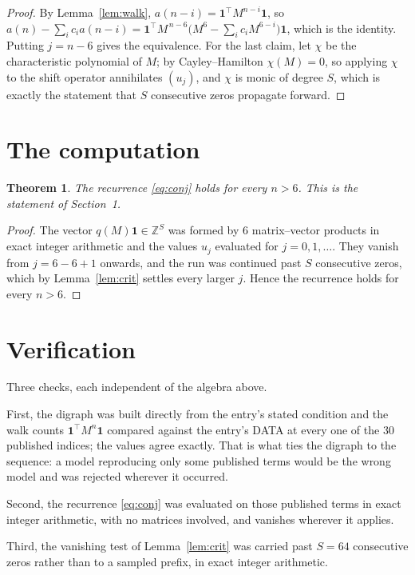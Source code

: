 \documentclass[11pt,a4paper]{article}
\theoremstyle{plain}
\newtheorem{theorem}{Theorem}
\theoremstyle{definition}
\begin{document}
\begin{proof}
By Lemma~\ref{lem:walk}, $a(n-i)=\mathbf{1}^{\!\top}M^{n-i}\mathbf{1}$, so
$a(n)-\sum_i c_i a(n-i)
=\mathbf{1}^{\!\top}M^{\,n-6}\bigl(M^{6}-\sum_i c_i M^{6-i}\bigr)
\mathbf{1}$, which is the identity. Putting $j=n-6$ gives the equivalence. For the
last claim, let $\chi$ be the characteristic polynomial of $M$; by Cayley--Hamilton
$\chi(M)=0$, so applying $\chi$ to the shift operator annihilates $(u_j)$, and $\chi$ is
monic of degree $S$, which is exactly the statement that $S$ consecutive zeros propagate
forward.
\end{proof}

\section{The computation}

\begin{theorem}
The recurrence \eqref{eq:conj} holds for every $n>6$. This is the statement of
Section~1.
\end{theorem}

\begin{proof}
The vector $q(M)\mathbf{1}\in\mathbb{Z}^{S}$ was formed by $6$ matrix--vector
products in exact integer arithmetic and the values $u_j$ evaluated for
$j=0,1,\dots$. They vanish from $j=6-6+1$ onwards, and the run was continued past
$S$ consecutive zeros, which by Lemma~\ref{lem:crit} settles every larger $j$. Hence the
recurrence holds for every $n>6$.
\end{proof}

\section{Verification}

Three checks, each independent of the algebra above.

First, the digraph was built directly from the entry's stated condition and the walk counts
$\mathbf{1}^{\!\top}M^{n}\mathbf{1}$ compared against the entry's DATA at every one of
the $30$ published indices; the values agree exactly. That is what ties the digraph to
the sequence: a model reproducing only some published terms would be the wrong model and
was rejected wherever it occurred.

Second, the recurrence \eqref{eq:conj} was evaluated on those published terms in exact
integer arithmetic, with no matrices involved, and vanishes wherever it applies.

Third, the vanishing test of Lemma~\ref{lem:crit} was carried past $S=64$ consecutive
zeros rather than to a sampled prefix, in exact integer arithmetic.
\end{document}
